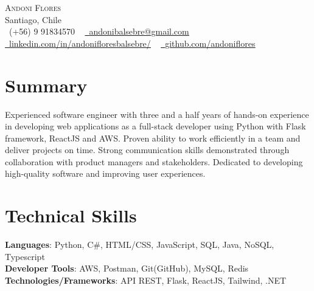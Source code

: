 \documentclass[letterpaper,11pt]{article}
\newcommand{\resumeSubHeadingListStart}{\begin{itemize}[leftmargin=0.0in, label={}]}
\newcommand{\resumeSubHeadingListEnd}{\end{itemize}}
\begin{document}

\begin{center}
    {\Huge \scshape Andoni Flores} \\ \vspace{1pt}
    Santiago, Chile \\ \vspace{1pt}
    \small \raisebox{-0.1\height}\faPhone\ (+56) 9 91834570 ~ \href{mailto:andonibalsebre@gmail.com}{\raisebox{-0.2\height}\faEnvelope\  \underline{andonibalsebre@gmail.com}} ~ 
    \href{https://linkedin.com/in/andonifloresbalsebre/}{\raisebox{-0.2\height}\faLinkedin\ \underline{linkedin.com/in/andonifloresbalsebre/}}  ~
    \href{https://github.com/andoniflores}{\raisebox{-0.2\height}\faGithub\ \underline{github.com/andoniflores}}
    \vspace{-8pt}
\end{center}

%
\section{Summary}
  \resumeSubHeadingListStart
    \small{\item{Experienced software engineer with three and a half years of hands-on experience in developing web applications as a full-stack developer using Python with Flask framework, ReactJS and AWS. Proven ability to work efficiently in a team and deliver projects on time. Strong communication skills demonstrated through collaboration with product managers and stakeholders. Dedicated to developing high-quality software and improving user experiences.}}
  \resumeSubHeadingListEnd

\section{Technical Skills}
 \begin{itemize}[leftmargin=0.15in, label={}]
    \small{\item{
     \textbf{Languages}{: Python, C\#, HTML/CSS, JavaScript, SQL, Java, NoSQL, Typescript} \\
     \textbf{Developer Tools}{: AWS, Postman, Git(GitHub), MySQL, Redis} \\
     \textbf{Technologies/Frameworks}{: API REST, Flask, ReactJS, Tailwind, .NET} \\
    }}
 \end{itemize}
 \vspace{-16pt}
\end{document}
